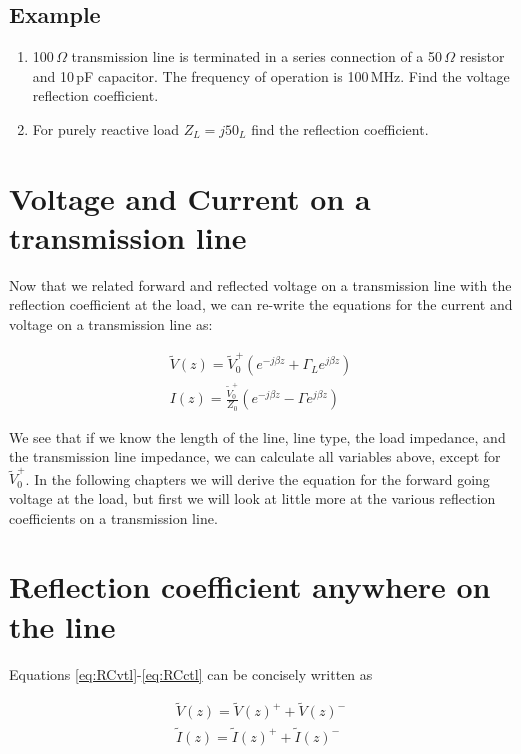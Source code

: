 \documentclass{ximera}
\begin{document}
\subsection{Example}


 \begin{enumerate}
\item 100\,$\Omega$ transmission line is terminated in a series
connection of a 50\,$\Omega$ resistor and 10\,pF capacitor. The frequency
of operation is 100\,MHz. Find the voltage reflection coefficient.
\item For purely reactive load $Z_L=j 50_L$ find the reflection
coefficient.
\end{enumerate}

\section{Voltage and Current on a transmission line}

Now that we related forward and reflected voltage on a transmission line with the reflection coefficient at the load, we can re-write the equations for the current and voltage on a transmission line as:

\begin{eqnarray}
\tilde{V}(z)= \tilde{V}_0^+ (e^{-j \beta z} + \Gamma_L  e^{j \beta z }  ) \label{eq:vtlfin} \\
I(z)=   \frac{\tilde{V}_0^+}{Z_0}  (e^{-j \beta z} - \Gamma  e^{j \beta z}  ) \label{eq:itlfin}
\end{eqnarray}

We see that if we know the length of the line, line type, the load impedance, and the transmission line impedance, we can calculate all variables above, except for  $\tilde{V}_0^+ $. In the following chapters we will derive the equation for the forward going voltage at the load, but first we will look at little more at the various reflection coefficients on a transmission line. 

\section{Reflection coefficient anywhere on the line}

Equations \ref{eq:RCvtl}-\ref{eq:RCctl}  can be concisely written as 

\begin{eqnarray}
\tilde{V}(z) =\tilde{V}(z)^+ + \tilde{V}(z)^- \\
\tilde{I}(z) =\tilde{I}(z)^+ + \tilde{I}(z)^- 
\end{eqnarray}
\end{document}

